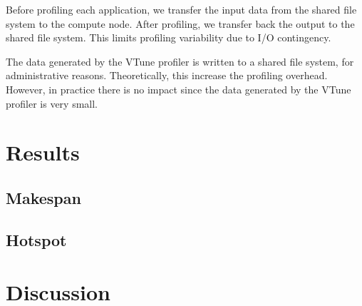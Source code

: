 \documentclass[conference]{IEEEtran}
\begin{document}
Before profiling each application, we transfer the input data from the shared file system to the compute node. After profiling, we transfer back the output to the shared file system. This limits profiling variability due to I/O contingency.

The data generated by the VTune profiler is written to a shared file system, for administrative reasons. Theoretically, this increase the profiling overhead. However, in practice there is no impact since the data generated by the VTune profiler is very small.

\section{Results}

\subsection{Makespan}


\subsection{Hotspot}
% 


\section{Discussion}


\end{document}
